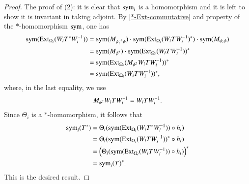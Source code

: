 \documentclass[leqno]{amsart}
\begin{document}
\begin{proof}
		The proof of (2): it is clear that ${\rm sym}_{i}$ is a homomorphism and it is left to show it is invariant in taking adjoint. By \eqref{*-Ext-commutative} and property of the $*$-homomorphism ${\rm sym}$, one has
		\begin{align*}
			{\rm sym}({\rm Ext}_{\Omega_{i}}(W_{i}T^{*} W_{i}^{-1}))
			&={\rm sym}(M_{\psi_{i}^{-1}\phi})\cdot {\rm sym}({\rm Ext}_{\Omega_{i}}(W_{i}T W_{i}^{-1})^{*})\cdot {\rm sym}(M_{\psi_{i}\phi})\\
			&={\rm sym}(M_{\phi^{2}})\cdot {\rm sym}({\rm Ext}_{\Omega_{i}}(W_{i}T W_{i}^{-1}))^{*}\\
			&={\rm sym}({\rm Ext}_{\Omega_{i}}(M_{\phi^{2}}W_{i}T W_{i}^{-1}))^{*}\\
			&={\rm sym}({\rm Ext}_{\Omega_{i}}(W_{i}T W_{i}^{-1}))^{*},
		\end{align*}
		where, in the last equality, we use
		$$M_{\phi^{2}}W_{i}T W_{i}^{-1}=W_{i}T W_{i}^{-1}.$$
		Since $\Theta_{i}$ is a $*$-homomorphism, it follows that
		\begin{align*}
			{\rm sym}_{i}(T^{*})&=\Theta_{i}({\rm sym}({\rm Ext}_{\Omega_{i}}(W_{i}T^{*} W_{i}^{-1}))\circ h_{i})\\
			&=\Theta_{i}({\rm sym}({\rm Ext}_{\Omega_{i}}(W_{i}T W_{i}^{-1}))^{*}\circ h_{i})\\
			&=\left(\Theta_{i}({\rm sym}({\rm Ext}_{\Omega_{i}}(W_{i}T W_{i}^{-1}))\circ h_{i})\right)^{*}\\
			&={\rm sym}_{i}(T)^{*}.
		\end{align*}
		This is the desired result.
	\end{proof}
	
\end{document}
